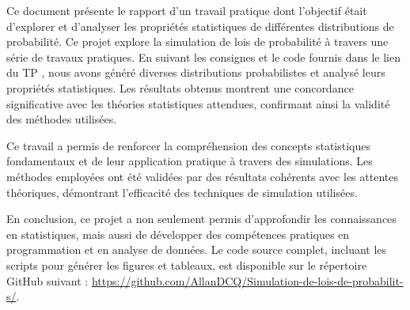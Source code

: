 Ce document présente le rapport d'un travail pratique dont l'objectif était d'explorer et d'analyser les propriétés statistiques de différentes distributions de probabilité. 
Ce projet explore la simulation de lois de probabilité à travers une série de travaux pratiques. 
En suivant les consignes et le code fournis dans le lien du TP \cite{TP}, nous avons généré diverses distributions probabilistes et analysé leurs propriétés statistiques. 
Les résultats obtenus montrent une concordance significative avec les théories statistiques attendues, confirmant ainsi la validité des méthodes utilisées.

Ce travail a permis de renforcer la compréhension des concepts statistiques fondamentaux et de leur application pratique à travers des simulations. Les méthodes employées ont été validées par des résultats cohérents avec les attentes théoriques, démontrant l'efficacité des techniques de simulation utilisées.

En conclusion, ce projet a non seulement permis d'approfondir les connaissances en statistiques, mais aussi de développer des compétences pratiques en programmation et en analyse de données. 
Le code source complet, incluant les scripts pour générer les figures et tableaux, est disponible sur le répertoire GitHub suivant : \href{https://github.com/AllanDCQ/Simulation-de-lois-de-probabilit-s/}{https://github.com/AllanDCQ/Simulation-de-lois-de-probabilit-s/}.
